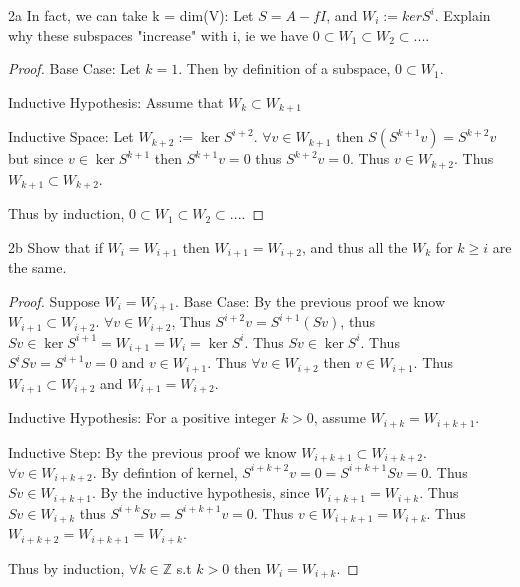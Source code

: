 \documentclass{article}
\newcommand{\Z}{\mathbb{Z}}
\begin{document}
\begin{PROB}{2a}\label{Problem 2a.}
    In fact, we can take k = dim(V):  Let $S = A - fI$, and $W_i := ker S^i$. Explain why these subspaces "increase" with i, ie we have $0 \subset W_1 \subset W_2 \subset ... $.
\end{PROB}
\begin{proof}
    Base Case: Let $k = 1$. Then by definition of a subspace, $0 \subset W_1$.

    Inductive Hypothesis: Assume that $W_k \subset W_{k+1}$

    Inductive Space: Let $W_{k + 2}:= \ker S^{i + 2}$. $\forall v \in W_{k + 1}$ then $S(S^{k + 1}v) = S^{k+2}v$ but since $v \in \ker S^{k + 1}$ then $S^{k + 1}v = 0$ thus $S^{k + 2}v = 0$. Thus $v \in W_{k + 2}$. Thus $W_{k+1} \subset W_{k+2}$. 

    Thus by induction, $0 \subset W_1 \subset W_2 \subset ... $.
\end{proof}
\begin{PROB}{2b}\label{Problem 2b.}
    Show that if $W_i = W_{i+1}$ then $W_{i+1} = W_{i+2}$, and thus all the $W_k$ for $k \geq i$ are the same. 
\end{PROB}
\begin{proof}

    Suppose $W_i = W_{i + 1}$.
    Base Case: By the previous proof we know $W_{i+1} \subset W_{i+2}$. $\forall v \in W_{i + 2}$, Thus $S^{i + 2}v = S^{i + 1}(Sv)$, thus $Sv \in \ker S^{i+1} = W_{i + 1} = W_{i} = \ker S^i$. Thus $Sv \in \ker S^{i}$. Thus $S^{i}Sv = S^{i + 1}v = 0$ and $v \in W_{i + 1}$. Thus $\forall v \in W_{i + 2}$ then $v \in W_{i + 1}$. Thus $W_{i + 1} \subset W_{i + 2}$ and $W_{i + 1} = W_{i + 2}$. 

    Inductive Hypothesis: For a positive integer $k > 0$, assume $W_{i + k} = W_{i + k + 1}$.

    Inductive Step: By the previous proof we know $W_{i + k +1} \subset W_{i +k+2}$. $\forall v \in W_{i + k + 2}$. By defintion of kernel, $S^{i + k + 2}v = 0 = S^{i + k + 1}Sv = 0$. Thus $Sv \in W_{i + k + 1}$. By the inductive hypothesis, since $W_{i + k + 1} = W_{i + k}$. Thus $Sv \in W_{i + k}$ thus $S^{i+k}Sv = S^{i+k+1}v = 0$. Thus $v \in W_{i + k + 1} = W_{i + k}$. Thus $W_{i + k + 2} = W_{i + k + 1} = W_{i + k}$.

    Thus by induction, $\forall k \in \Z$ s.t $k > 0$ then $W_i = W_{i + k}$.
\end{proof}
\end{document}
